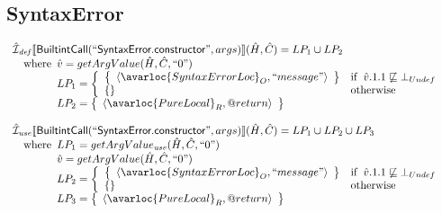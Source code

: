 \subsection{SyntaxError}
\[
\begin{array}{l}

\aI_{\it def}\lbr \SF{BuiltintCall}(``\SF{SyntaxError.constructor}",args)\rbr(\hat{H},\hat{C})
  = LP_1 \cup LP_2\\
\quad\wherec{
  \hat{v} = getArgValue(\hat{H}, \hat{C}, ``0")\\
  LP_1 = \left\{\begin{array}{ll}
  \set{\langle\avarloc{SyntaxErrorLoc}_O, ``message"\rangle} & \ifc{\hat{v}.1.1 \not\sqsubseteq \bot_{Undef}}\\
  \set{} & \owc\\
    \end{array}\right.\\
  LP_2 = \set{\langle\avarloc{PureLocal}_R,\varprop{return}\rangle}\\
  }\\
\\

\aI_{\it use}\lbr \SF{BuiltintCall}(``\SF{SyntaxError.constructor}",args)\rbr(\hat{H},\hat{C})
  = LP_1 \cup LP_2 \cup LP_3\\
\quad\wherec{
  LP_1 = getArgValue_{\it use}(\hat{H}, \hat{C}, ``0")\\
  \hat{v} = getArgValue(\hat{H}, \hat{C}, ``0")\\
  LP_2 = \left\{\begin{array}{ll}
  \set{\langle\avarloc{SyntaxErrorLoc}_O, ``message"\rangle} & \ifc{\hat{v}.1.1 \not\sqsubseteq \bot_{Undef}}\\
  \set{} & \owc\\
    \end{array}\right.\\
  LP_3 = \set{\langle\avarloc{PureLocal}_R,\varprop{return}\rangle}\\
  }\\
\\

\end{array}
\]


